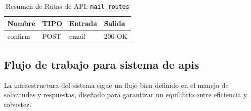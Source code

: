 \begin{table}[H]
\centering
\begin{tabularx}{\textwidth}{|l|l|l|X|}
\hline
\textbf{Nombre} & \textbf{TIPO} & \textbf{Entrada} & \textbf{Salida} \\ \hline
confirm & POST & email & 200-OK \\ \hline
\end{tabularx}
\caption{Resumen de Rutas de API: \texttt{mail\_routes}}
\label{tab:mail_routes}
\end{table}



\subsection{Flujo de trabajo para sistema de apis}

La infraestructura del sistema sigue un flujo bien definido en el manejo de solicitudes y respuestas, diseñado para garantizar un equilibrio entre eficiencia y robustez.

